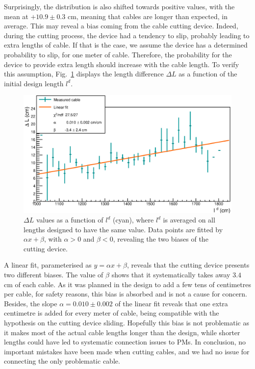 Surprisingly, the distribution is also shifted towards positive values, with the mean at $+10.9\pm 0.3$ cm, meaning that cables are longer than expected, in average.
This may reveal a bias coming from the cable cutting device.
Indeed, during the cutting process, the device had a tendency to slip, probably leading to extra lengths of cable.
If that is the case, we assume the device has a determined probability to slip, for one meter of cable.
Therefore, the probability for the device to provide extra length should increase with the cable length.
To verify this assumption, Fig.~\ref{fig:CutBias} displays the length difference $\Delta L$ as a function of the initial design length $l^{d}$.
\begin{figure}[h!]
  \centering
  \includegraphics[width=15cm]{commissioning/fig_commissioning/cut_biais.eps}
  \caption{$\Delta L$ values as a function of $l^{d}$ (cyan), where $l^{d}$ is averaged on all lengths designed to have the same value.
    Data points are fitted by $\alpha x + \beta$, with $\alpha > 0$ and $\beta < 0$, revealing the two biases of the cutting device.
    \label{fig:CutBias}}
\end{figure}
A linear fit, parameterised as $y = \alpha x + \beta$, reveals that the cutting device presents two different biases.
The value of $\beta$ shows that it systematically takes away $3.4$ cm of each cable.
As it was planned in the design to add a few tens of centimetres per cable, for safety reasons, this bias is absorbed and is not a cause for concern.
Besides, the slope $\alpha = 0.010\pm 0.002$ of the linear fit reveals that one extra centimetre is added for every meter of cable, being compatible with the hypothesis on the cutting device sliding.
Hopefully this bias is not problematic as it makes most of the actual cable lengths longer than the design, while shorter lengths could have led to systematic connection issues to PMs.
In conclusion, no important mistakes have been made when cutting cables, and we had no issue for connecting the only problematic cable.

